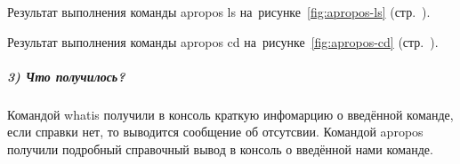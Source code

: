 Результат выполнения команды apropos ls
на~рисунке~\ref{fig:apropos-ls}
(стр.~\pageref{fig:apropos-ls}).

Результат выполнения команды apropos cd
на~рисунке~\ref{fig:apropos-cd}
(стр.~\pageref{fig:apropos-cd}).

\subparagraph{3) Что получилось?}

Командой whatis получили в консоль краткую инфомарцию о введённой команде, если справки нет, то выводится сообщение об отсутсвии. Командой apropos получили подробный справочный вывод в консоль о введённой нами команде.

